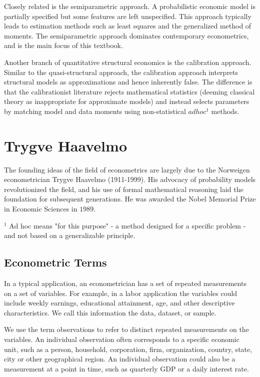 \documentclass[10pt]{article}
\begin{document}
Closely related is the semiparametric approach. A probabilistic economic model is partially specified but some features are left unspecified. This approach typically leads to estimation methods such as least squares and the generalized method of moments. The semiparametric approach dominates contemporary econometrics, and is the main focus of this textbook.

Another branch of quantitative structural economics is the calibration approach. Similar to the quasi-structural approach, the calibration approach interprets structural models as approximations and hence inherently false. The difference is that the calibrationist literature rejects mathematical statistics (deeming classical theory as inappropriate for approximate models) and instead selects parameters by matching model and data moments using non-statistical $a d h o c^{1}$ methods.

\section{Trygve Haavelmo}
The founding ideas of the field of econometrics are largely due to the Norweigen econometrician Trygve Haavelmo (1911-1999). His advocacy of probability models revolutionized the field, and his use of formal mathematical reasoning laid the foundation for subsequent generations. He was awarded the Nobel Memorial Prize in Economic Sciences in $1989 .$

${ }^{1}$ Ad hoc means "for this purpose" - a method designed for a specific problem - and not based on a generalizable principle.

\subsection{Econometric Terms}
In a typical application, an econometrician has a set of repeated measurements on a set of variables. For example, in a labor application the variables could include weekly earnings, educational attainment, age, and other descriptive characteristics. We call this information the data, dataset, or sample.

We use the term observations to refer to distinct repeated measurements on the variables. An individual observation often corresponds to a specific economic unit, such as a person, household, corporation, firm, organization, country, state, city or other geographical region. An individual observation could also be a measurement at a point in time, such as quarterly GDP or a daily interest rate.
\end{document}
